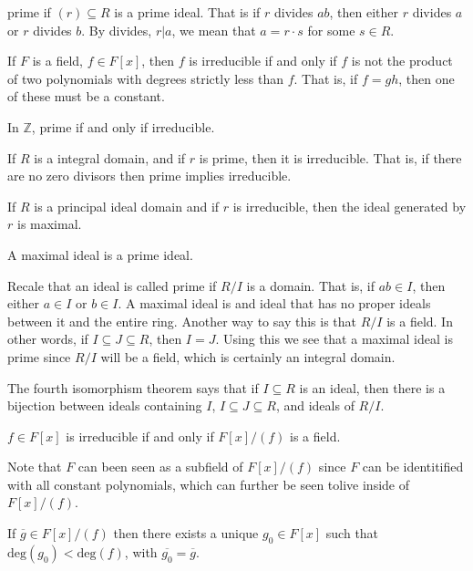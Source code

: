     prime if $(r)\subseteq{R}$ is a prime ideal. That is if
    $r$ divides $ab$, then either $r$ divides $a$ or $r$ divides $b$.
    By divides, $r|a$, we mean that $a=r\cdot{s}$ for some $s\in{R}$.
    \begin{example}
        If $F$ is a field, $f\in{F}[x]$, then $f$ is irreducible if and
        only if $f$ is not the product of two polynomials with degrees
        strictly less than $f$. That is, if $f=gh$, then one of these
        must be a constant.
    \end{example}
    \begin{example}
        In $\mathbb{Z}$, prime if and only if irreducible.
    \end{example}
    \begin{theorem}
        If $R$ is a integral domain, and if $r$ is prime, then it is
        irreducible. That is, if there are no zero divisors then prime
        implies irreducible.
    \end{theorem}
    \begin{theorem}
        If $R$ is a principal ideal domain and if $r$ is irreducible,
        then the ideal generated by $r$ is maximal.
    \end{theorem}
    \begin{theorem}
        A maximal ideal is a prime ideal.
    \end{theorem}
    Recale that an ideal is called prime if $R/I$ is a domain. That is,
    if $ab\in{I}$, then either $a\in{I}$ or $b\in{I}$. A maximal ideal
    is and ideal that has no proper ideals between it and the entire
    ring. Another way to say this is that $R/I$ is a field. In other
    words, if $I\subseteq{J}\subseteq{R}$, then $I=J$. Using this we see
    that a maximal ideal is prime since $R/I$ will be a field, which is
    certainly an integral domain.
    \begin{theorem}
        The fourth isomorphism theorem says that if $I\subseteq{R}$ is
        an ideal, then there is a bijection between ideals containing
        $I$, $I\subseteq{J}\subseteq{R}$, and ideals of $R/I$.
    \end{theorem}
    \begin{theorem}
        $f\in{F}[x]$ is irreducible if and only if $F[x]/(f)$ is a
        field.
    \end{theorem}
    Note that $F$ can been seen as a subfield of $F[x]/(f)$ since
    $F$ can be identitified with all constant polynomials, which can
    further be seen tolive inside of $F[x]/(f)$.
    \begin{theorem}
        If $\overline{g}\in{F}[x]/(f)$ then there exists a unique
        $g_{0}\in{F}[x]$ such that$\textrm{deg}(g_{0})<\textrm{deg}(f)$,
        with $\overline{g_{0}}=\overline{g}$.
    \end{theorem}
